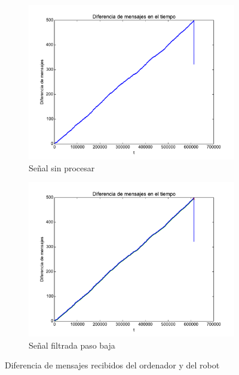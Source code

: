 \begin{figure}[]
	\centering
	\begin{subfigure}[b]{0.45\textwidth}
		\includegraphics[width=\linewidth]{imagenes/desarrollo/diferencia.pdf}
		\caption{Señal sin procesar}
		\label{fig:desarrollo/diferencia}
	\end{subfigure}
	\begin{subfigure}[b]{0.45\textwidth}
		\includegraphics[width=\linewidth]{imagenes/desarrollo/diferenciafilt.pdf}
		\caption{Señal filtrada paso baja}
		\label{fig:desarrollo/diferenciafilt}
	\end{subfigure}
	\caption{Diferencia de mensajes recibidos del ordenador y del robot}
\end{figure}

